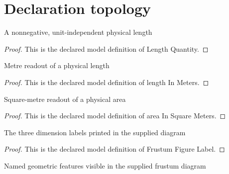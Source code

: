 \section{Declaration topology}
\begin{definition}
  \label{def:physics:phyx-mini-0666:phyxminiproblems-problemphyxmini0666-lengthquantity}
  A nonnegative, unit-independent physical length
\end{definition}
\begin{proof}
  This is the declared model definition of Length Quantity.
\end{proof}
\begin{definition}
  \label{def:physics:phyx-mini-0666:phyxminiproblems-problemphyxmini0666-lengthinmeters}
  Metre readout of a physical length
\end{definition}
\begin{proof}
  This is the declared model definition of length In Meters.
\end{proof}
\begin{definition}
  \label{def:physics:phyx-mini-0666:phyxminiproblems-problemphyxmini0666-areainsquaremeters}
  Square-metre readout of a physical area
\end{definition}
\begin{proof}
  This is the declared model definition of area In Square Meters.
\end{proof}
\begin{definition}
  \label{def:physics:phyx-mini-0666:phyxminiproblems-problemphyxmini0666-frustumfigurelabel}
  The three dimension labels printed in the supplied diagram
\end{definition}
\begin{proof}
  This is the declared model definition of Frustum Figure Label.
\end{proof}
\begin{definition}
  \label{def:physics:phyx-mini-0666:phyxminiproblems-problemphyxmini0666-frustumfigurefeature}
  Named geometric features visible in the supplied frustum diagram
\end{definition}
